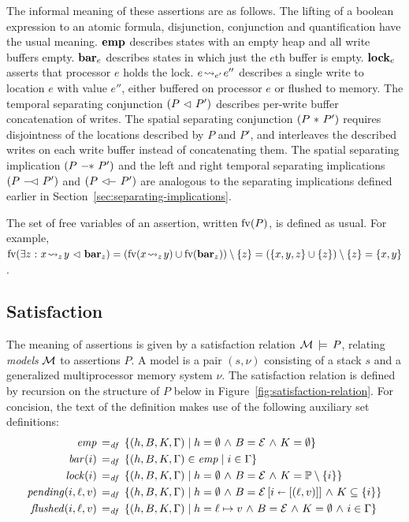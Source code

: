 \documentclass[11pt]{report}
\begin{document}
The informal meaning of these assertions are as follows. The lifting of a boolean expression to an atomic formula, disjunction, conjunction and quantification have the usual meaning. $\mathbf{emp}$ describes states with an empty heap and all write buffers empty. $\mathbf{bar}_{e}$ describes states in which just the $e$th buffer is empty. $\mathbf{lock}_{e}$ asserts that processor $e$ holds the lock. $e \!\leadsto_{e'}\! e''$ describes a single write to location $e$ with value $e''$, either buffered on processor $e$ or flushed to memory. The temporal separating conjunction $(P \operatorname{\,\vartriangleleft\,} P')$ describes per-write buffer concatenation of writes. The spatial separating conjunction $(P \operatorname{\,\ast\,} P')$ requires disjointness of the locations described by $P$ and $P'$, and interleaves the described writes on each write buffer instead of concatenating them. The spatial separating implication $(P \fsepi P')$ and the left and right temporal separating implications $(P \fseqli P')$ and $(P \fseqri P')$ are analogous to the separating implications defined earlier in Section~\ref{sec:separating-implications}. 

The set of free variables of an assertion, written $\mathrm{fv}(P)$, is defined as usual. For example, $\mathrm{fv}(\exists z \operatorname{\,:\,} x \!\leadsto_{z}\! y \operatorname{\,\vartriangleleft\,} \mathbf{bar}_{z}) = (\mathrm{fv}(x \!\leadsto_{z}\! y) \cup \mathrm{fv}(\mathbf{bar}_{z})) \setminus \left\lbrace z \right\rbrace = (\left\lbrace x,y,z \right\rbrace \cup \left\lbrace z \right\rbrace) \setminus \left\lbrace z \right\rbrace = \left\lbrace x,y \right\rbrace$. 

\subsection{Satisfaction}

The meaning of assertions is given by a satisfaction relation $\mathcal{M} \,\models\, P$, relating \emph{models} $\mathcal{M}$ to assertions $P$. A model is a pair $(s,\nu)$ consisting of a stack $s$ and a generalized multiprocessor memory system $\nu$. 
The satisfaction relation is defined by recursion on the structure of $P$ below in Figure~\ref{fig:satisfaction-relation}. For concision, the text of the definition makes use of the following auxiliary set definitions: \begin{align*}
  \mathit{emp} \operatorname{\;=_{\mathit{df}}\;} & \left\lbrace (h,B,K,\Gamma) \mid h = \operatorname{\emptyset} \operatorname{\,\wedge\,} B = \mathcal{E} \operatorname{\,\wedge\,} K = \operatorname{\emptyset} \right\rbrace \\ 
  \mathit{bar}(i) \operatorname{\;=_{\mathit{df}}\;} & \left\lbrace (h,B,K,\Gamma) \in \mathit{emp} \mid i \in \Gamma \right\rbrace \\ 
  \mathit{lock}(i) \operatorname{\;=_{\mathit{df}}\;} & \left\lbrace (h,B,K,\Gamma) \mid h = \operatorname{\emptyset} \operatorname{\,\wedge\,} B = \mathcal{E} \operatorname{\,\wedge\,} K = \mathbb{P} \setminus \left\lbrace i \right\rbrace \right\rbrace \\ 
  \mathit{pending}(i,\ell,v) \operatorname{\;=_{\mathit{df}}\;} & \left\lbrace (h,B,K,\Gamma) \mid h = \operatorname{\emptyset} \operatorname{\,\wedge\,} B = \mathcal{E} \left[ i \shortleftarrow \left[(\ell,v)\right] \right] \operatorname{\,\wedge\,} K \subseteq \left\lbrace i \right\rbrace \right\rbrace \\ 
  \mathit{flushed}(i,\ell,v) \operatorname{\;=_{\mathit{df}}\;} & \left\lbrace (h,B,K,\Gamma) \mid h = \ell \mapsto v \operatorname{\,\wedge\,} B = \mathcal{E} \operatorname{\,\wedge\,} K = \operatorname{\emptyset} \operatorname{\,\wedge\,} i \in \Gamma \right\rbrace 
\end{align*}
\end{document}
